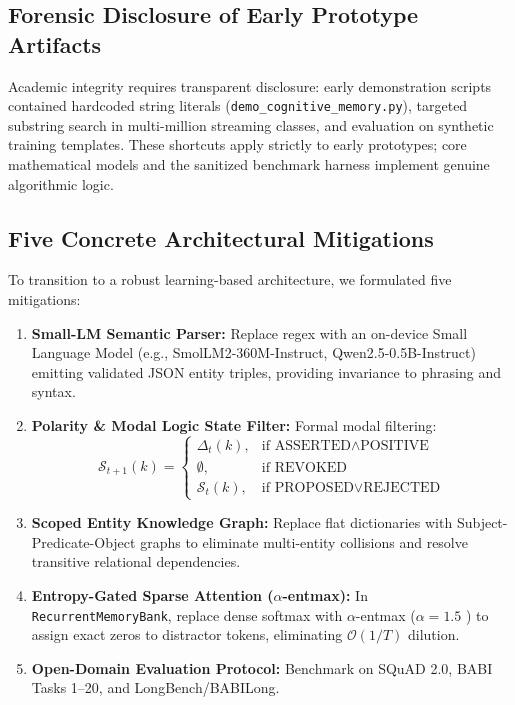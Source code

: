\documentclass[11pt,a4paper]{article}
\begin{document}
\subsection{Forensic Disclosure of Early Prototype Artifacts}
Academic integrity requires transparent disclosure: early demonstration scripts contained hardcoded string literals (\texttt{demo\_cognitive\_memory.py}), targeted substring search in multi-million streaming classes, and evaluation on synthetic training templates. These shortcuts apply strictly to early prototypes; core mathematical models and the sanitized benchmark harness implement genuine algorithmic logic.

\subsection{Five Concrete Architectural Mitigations}
\label{sec:mitigations}
To transition to a robust learning-based architecture, we formulated five mitigations:
\begin{enumerate}
    \item \textbf{Small-LM Semantic Parser:} Replace regex with an on-device Small Language Model (e.g., SmolLM2-360M-Instruct, Qwen2.5-0.5B-Instruct) emitting validated JSON entity triples, providing invariance to phrasing and syntax.
    \item \textbf{Polarity \& Modal Logic State Filter:} Formal modal filtering:
    \begin{equation}
    \mathcal{S}_{t+1}(k) = \begin{cases} 
    \Delta_t(k), & \text{if } \text{ASSERTED} \land \text{POSITIVE} \\ 
    \emptyset, & \text{if } \text{REVOKED} \\ 
    \mathcal{S}_t(k), & \text{if } \text{PROPOSED} \lor \text{REJECTED} 
    \end{cases}
    \end{equation}
    \item \label{sec:scoped_graph} \textbf{Scoped Entity Knowledge Graph:} Replace flat dictionaries with Subject-Predicate-Object graphs to eliminate multi-entity collisions and resolve transitive relational dependencies.
    \item \textbf{Entropy-Gated Sparse Attention ($\alpha$-entmax):} In \texttt{RecurrentMemoryBank}, replace dense softmax with $\alpha$-entmax ($\alpha = 1.5$ \cite{peters2019sparse}) to assign exact zeros to distractor tokens, eliminating $\mathcal{O}(1/T)$ dilution.
    \item \textbf{Open-Domain Evaluation Protocol:} Benchmark on SQuAD 2.0, BABI Tasks 1--20, and LongBench/BABILong.
\end{enumerate}
\end{document}
